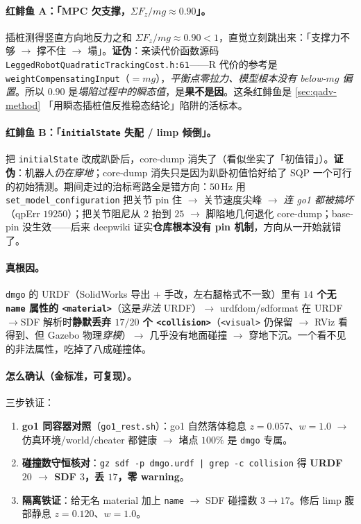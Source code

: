 \paragraph{红鲱鱼 A：「MPC 欠支撑，$\Sigma F_z/mg\approx0.90$」。}
插桩测得竖直方向地反力之和 $\Sigma F_z/mg\approx0.90<1$，直觉立刻跳出来：「支撑力不够 $\to$ 撑不住 $\to$ 塌」。\textbf{证伪}：亲读代价函数源码 \texttt{LeggedRobotQuadraticTrackingCost.h:61}——R 代价的参考是 \texttt{weightCompensatingInput}（$=mg$），\emph{平衡点零拉力、模型根本没有 below-$mg$ 偏置}。所以 $0.90$ 是\emph{塌陷过程中的瞬态值}，是\textbf{果不是因}。这条红鲱鱼是 \cref{sec:qadv-method} 「用瞬态插桩值反推稳态结论」陷阱的活标本。

\paragraph{红鲱鱼 B：「\texttt{initialState} 失配 / limp 倾倒」。}
把 \texttt{initialState} 改成趴卧后，core-dump 消失了（看似坐实了「初值错」）。\textbf{证伪}：机器人\emph{仍在穿地}；core-dump 消失只是因为趴卧初值恰好给了 SQP 一个可行的初始猜测。期间走过的治标弯路全是错方向：$50$\,Hz 用 \texttt{set\_model\_configuration} 把关节 pin 住 $\to$ 关节速度尖峰 $\to$ \emph{连 go1 都被搞坏}（qpErr $19250$）；把关节阻尼从 $2$ 抬到 $25$ $\to$ 脚陷地几何退化 core-dump；base-pin 没生效——后来 deepwiki 证实\textbf{仓库根本没有 pin 机制}，方向从一开始就错了。

\paragraph{真根因。}
\texttt{dmgo} 的 URDF（SolidWorks 导出 + 手改，左右腿格式不一致）里有 \textbf{$14$ 个无 \texttt{name} 属性的 \texttt{<material>}}（这是\emph{非法} URDF）$\to$ urdfdom/sdformat 在 URDF$\to$SDF 解析时\textbf{静默丢弃 $17/20$ 个 \texttt{<collision>}}（\texttt{<visual>} 仍保留 $\to$ RViz 看得到、但 Gazebo 物理\emph{穿模}）$\to$ 几乎没有地面碰撞 $\to$ 穿地下沉。一个看不见的非法属性，吃掉了八成碰撞体。

\paragraph{怎么确认（金标准，可复现）。}
三步铁证：
\begin{enumerate}
  \item \textbf{go1 同容器对照}（\texttt{go1\_rest.sh}）：go1 自然落体稳息 $z{=}0.057$、$w{=}1.0$ $\to$ 仿真环境/world/cheater 都健康 $\to$ 堵点 $100\%$ 是 \texttt{dmgo} 专属。
  \item \textbf{碰撞数守恒核对}：\texttt{gz sdf -p dmgo.urdf | grep -c collision} 得 \textbf{URDF $20$ $\to$ SDF $3$，丢 $17$，零 warning}。
  \item \textbf{隔离铁证}：给无名 material 加上 \texttt{name} $\to$ SDF 碰撞数 \textbf{$3\to17$}。修后 limp 腹部静息 $z{=}0.120$、$w{=}1.0$。
\end{enumerate}


